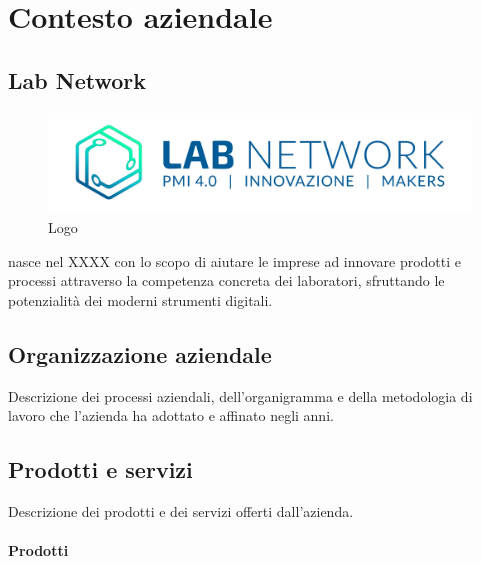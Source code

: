 
\chapter{Contesto aziendale}
\label{cap:introduzione}

\section{Lab Network}

\begin{figure}[h]
	\begin{center}
	\includegraphics[scale=0.4]{immagini/LOGO_LABNETWORK.png}
	\caption{Logo \lab{}}
	\end{center}
\end{figure}

\lab{} nasce nel XXXX con lo scopo di aiutare le imprese ad innovare prodotti e processi attraverso la competenza concreta dei laboratori, sfruttando le potenzialità dei moderni strumenti digitali.

\section{Organizzazione aziendale}
Descrizione dei processi aziendali, dell'organigramma e della metodologia di lavoro che l'azienda ha adottato e affinato negli anni.


\section{Prodotti e servizi}
Descrizione dei prodotti e dei servizi offerti dall'azienda.
\subsubsection{Prodotti}

